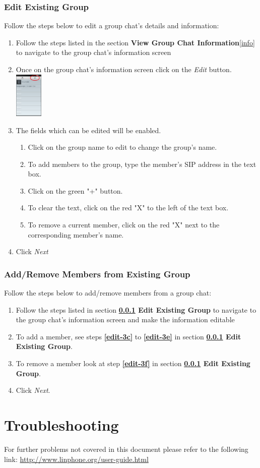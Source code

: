 \documentclass[11pt]{article}
\begin{document}
\subsubsection{Edit Existing Group}  \label{edit}
Follow the steps below to edit a group chat's details and information:
\begin{enumerate}
\item Follow the steps listed in the section \textbf{View Group Chat Information}\ref{info} to navigate to the group chat's information screen
\item Once on the group chat's information screen click on the \textit{Edit} button.\\
\includegraphics[width=50px]{images/groupchatInfoEdit.png}
\item The fields which can be edited will be enabled.
\begin{enumerate}
\item Click on the group name to edit to change the group's name.
\item To add members to the group, type the member's SIP address in the text box.\label{edit-3c}
\item Click on the green "+" button.
\item To clear the text, click on the red "X" to the left of the text box.\label{edit-3e}
\item To remove a current member, click on the red "X" next to the corresponding member's name.\label{edit-3f}
\end{enumerate}
\item Click \textit{Next}
\end{enumerate}


\subsubsection{Add/Remove Members from Existing Group}  \label{add}
Follow the steps below to add/remove members from a group chat:
\begin{enumerate}
\item Follow the steps listed in section \textbf{\ref{edit} Edit Existing Group} to navigate to the group chat's information screen and make the information editable
\item To add a member, see steps \textbf{\ref{edit-3c}} to \textbf{\ref{edit-3e}} in section \textbf{\ref{edit} Edit Existing Group}.
\item To remove a member look at step \textbf{\ref{edit-3f}} in section \textbf{\ref{edit} Edit Existing Group}.
\item Click \textit{Next}.
\end{enumerate}


\section{Troubleshooting}

For further problems not covered in this document please refer to the following link:
\url{http://www.linphone.org/user-guide.html}
\end{document}
